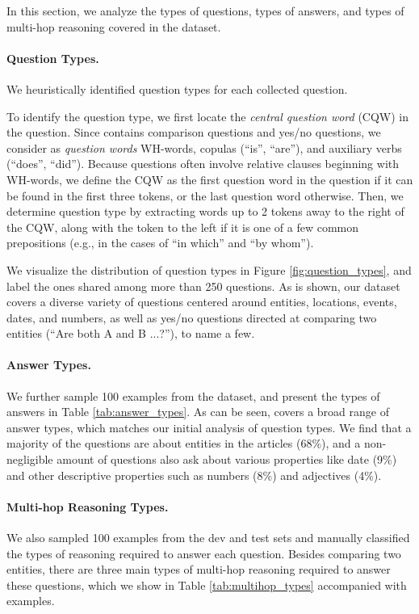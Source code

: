 In this section, we analyze the types of questions, types of answers, and types of multi-hop reasoning covered in the dataset.

\paragraph{Question Types.} We heuristically identified question types for each collected question.

To identify the question type, we first locate the \emph{central question word} (CQW) in the question. Since \datasetname{} contains comparison questions and yes/no questions, we consider as \emph{question words} WH-words, copulas (``is'', ``are''), and auxiliary verbs (``does'', ``did''). Because questions often involve relative clauses beginning with WH-words, we define the CQW as the first question word in the question if it can be found in the first three tokens, or the last question word otherwise. Then, we determine question type by extracting words up to 2 tokens away to the right of the CQW, along with the token to the left if it is one of a few common prepositions (e.g., in the cases of  ``in which'' and ``by whom'').

We visualize the distribution of question types in Figure \ref{fig:question_types}, and label the ones shared among more than 250 questions. As is shown, our dataset covers a diverse variety of questions centered around entities, locations, events, dates, and numbers, as well as yes/no questions directed at comparing two entities (``Are both A and B ...?''), to name a few.

\paragraph{Answer Types.} We further sample 100 examples from the dataset, and present the types of answers in Table \ref{tab:answer_types}.
As can be seen, \datasetname{} covers a broad range of answer types, which matches our initial analysis of question types. We find that a majority of the questions are about entities in the articles (68\%), and a non-negligible amount of questions also ask about various properties like date (9\%) and other descriptive properties such as numbers (8\%) and adjectives (4\%).

\paragraph{Multi-hop Reasoning Types.} We also sampled 100 examples from the dev and test sets and manually classified the types of reasoning required to answer each question. Besides comparing two entities, there are three main types of multi-hop reasoning required to answer these questions, which we show in Table \ref{tab:multihop_types} accompanied with examples.

